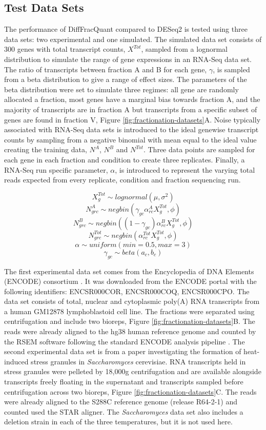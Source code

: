 \documentclass[../main.tex]{subfiles}
\begin{document}
\subsection{Test Data Sets}
The performance of DiffFracQuant compared to DESeq2 is tested using three data sets: two experimental and one simulated.
The simulated data set consists of 300 genes with total transcript counts, $X^{Tot}$, sampled from a lognormal distribution to simulate the range of gene expressions in an RNA-Seq data set.
The ratio of transcripts between fraction A and B for each gene, $\gamma$, is sampled from a beta distribution to give a range of effect sizes.
The parameters of the beta distribution were set to simulate three regimes: all gene are randomly allocated a fraction, most genes have a marginal bias towards fraction A, and the majority of transcripts are in fraction A but transcripts from a specific subset of genes are found in fraction V, Figure \ref{fig:fractionation-datasets}A.
Noise typically associated with RNA-Seq data sets is introduced to the ideal genewise transcript counts by sampling from a negative binomial with mean equal to the ideal value creating the training data, $N^{A}$, $N^{B}$ and $N^{Tot}$.
Three data points are sampled for each gene in each fraction and condition to create three replicates.
Finally, a RNA-Seq run specific parameter, $\alpha$, is introduced to represent the varying total reads expected from every replicate, condition and fraction sequencing run.

$$X^{Tot}_g \sim lognormal(\mu, \sigma^2)$$
$$N^{A}_{grc} \sim negbin(\gamma_{gc}\alpha^{A}_{rc}X^{Tot}_g,\phi)$$
$$N^{B}_{grc} \sim negbin((1-\gamma_{gc})\alpha^{B}_{rc}X^{Tot}_g,\phi)$$
$$N^{Tot}_{grc} \sim negbin(\alpha^{Tot}_{rc}X^{Tot}_g,\phi)$$
$$\alpha \sim uniform(min=0.5, max=3)$$
$$\gamma_{gc}\sim beta(a_c,b_c)$$

The first experimental data set comes from the Encyclopedia of DNA Elements (ENCODE) consortium \parencite{Dunham2012}. 
It was downloaded from the ENCODE portal with the following identifiers: ENCSR000COR, ENCSR000COQ, ENCSR000CPO.
The data set consists of total, nuclear and cytoplasmic poly(A) RNA transcripts from a human GM12878 lymphoblastoid cell line.
The fractions were separated using centrifugation and include two bioreps, Figure \ref{fig:fractionation-datasets}B.
The reads were already aligned to the hg38 human reference genome and counted by the RSEM software following the standard ENCODE analysis pipeline \parencite{Luo2020}.
The second experimental data set is from a paper investigating the formation of heat-induced stress granules in \textit{Saccharomyces} cerevisiae.
RNA transcripts held in stress granules were pelleted by 18,000g centrifugation and are available alongside transcripts freely floating in the supernatant and transcripts sampled before centrifugation across two bioreps, Figure \ref{fig:fractionation-datasets}C.
The reads were already aligned to the S288C reference genome (release R64-2-1) and counted used the STAR aligner.
The \textit{Saccharomyces} data set also includes a deletion strain in each of the three temperatures, but it is not used here. 
\end{document}
